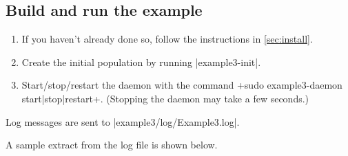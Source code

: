 \documentclass[a4paper,10pt]{report}
\begin{document}
\begin{itemize}


\section{Build and run the example}
\label{sec:run3}

\begin{enumerate}
\item If you haven't already done so, follow the instructions in 
\ref{sec:install}.
\item Create the initial population by running |example3-init|.
\item Start/stop/restart the daemon with the command
\UndefineShortVerb{\|}
\DefineShortVerb{\+}
+sudo example3-daemon start|stop|restart+.
\UndefineShortVerb{\+}
\DefineShortVerb{\|}
(Stopping the daemon may take a few seconds.)
\end{enumerate}

Log messages are sent to |example3/log/Example3.log|.

A sample extract from the log file is shown below.


\end{itemize}
\end{document}
